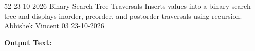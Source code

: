 \clearpage
\label{prog:52}
\programhead
  {52}
  {23-10-2026}
  {Binary Search Tree Traversals}
  {Inserts values into a binary search tree and displays inorder, preorder, and postorder traversals using recursion.}
  {Abhishek Vincent}
  {03}
  {23-10-2026}

\divider
\textbf{Output Text:}\par
\vspace{2pt}

